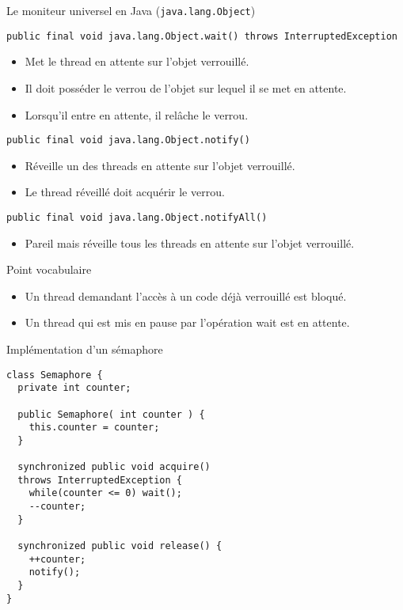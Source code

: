 \begin{frame}[fragile]{Le moniteur universel en Java (\lstinline|java.lang.Object|)}

\vfill    
  \begin{block}{\lstinline|public final void java.lang.Object.wait() throws InterruptedException|}
    \begin{itemize}
    \item Met le thread en attente sur l'objet verrouillé.
    \item Il doit \alert{posséder} le verrou de l'objet sur lequel il se met en attente.
    \item Lorsqu'il entre en attente, il \alert{relâche}  le verrou.
    \end{itemize}
  \end{block}

\vfill    
  \begin{block}{\lstinline|public final void java.lang.Object.notify()|}
    \begin{itemize}
    \item Réveille un des threads en attente sur l'objet verrouillé.
    \item Le thread réveillé doit \alert{acquérir} le verrou.
    \end{itemize}
  \end{block}

\vfill    
  \begin{block}{\lstinline|public final void java.lang.Object.notifyAll()|}
    \begin{itemize}
    \item Pareil mais réveille tous les threads en attente sur l'objet verrouillé.
    \end{itemize}
  \end{block}
\vfill
  \begin{alertblock}{Point vocabulaire}
    \begin{itemize}
    \item Un thread demandant l'accès à un code déjà verrouillé est \alert{bloqué}.
    \item Un  thread qui  est mis  en pause  par l'opération wait est \alert{en attente}.      
    \end{itemize}
  \end{alertblock}
\vfill
\end{frame}


\begin{frame}[fragile]{Implémentation d'un sémaphore}
 
  \begin{lstlisting}
class Semaphore {
  private int counter;
  
  public Semaphore( int counter ) {
    this.counter = counter;
  }
 
  synchronized public void acquire()
  throws InterruptedException {
    while(counter <= 0) wait();
    --counter;
  }
  
  synchronized public void release() {
    ++counter;
    notify();
  }
}
\end{lstlisting}
\end{frame}

